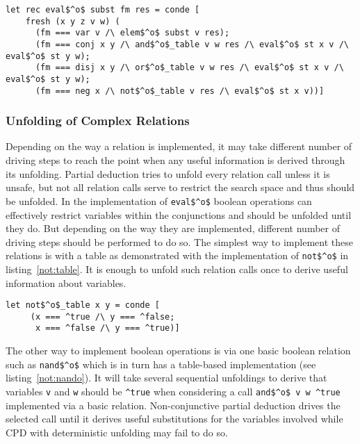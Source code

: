 \begin{lstlisting}[label={eval:fst}, caption={Evaluator of formulas with boolean operation second}, captionpos=b]
  let rec eval$^o$ subst fm res = conde [
    fresh (x y z v w) (
      (fm === var v /\ elem$^o$ subst v res);
      (fm === conj x y /\ and$^o$_table v w res /\ eval$^o$ st x v /\ eval$^o$ st y w);
      (fm === disj x y /\ or$^o$_table v w res /\ eval$^o$ st x v /\ eval$^o$ st y w);
      (fm === neg x /\ not$^o$_table v res /\ eval$^o$ st x v))]
  \end{lstlisting}

\subsubsection{Unfolding of Complex Relations}

Depending on the way a relation is implemented, it may take different number of driving steps to reach the point when any useful information is derived through its unfolding.
Partial deduction tries to unfold every relation call unless it is unsafe, but not all relation calls serve to restrict the search space and thus should be unfolded.
In the implementation of \lstinline{eval$^o$} boolean operations can effectively restrict variables within the conjunctions and should be unfolded until they do.
But depending on the way they are implemented, different number of driving steps should be performed to do so.
The simplest way to implement these relations is with a table as demonstrated with the implementation of \lstinline{not$^o$} in listing~\ref{not:table}.
It is enough to unfold such relation calls once to derive useful information about variables.

\begin{lstlisting}[label={not:table}, caption={Implementation of boolean \lstinline{not} as a table}, captionpos=b]
  let not$^o$_table x y = conde [
     (x === ^true /\ y === ^false;
      x === ^false /\ y === ^true)]
\end{lstlisting}

The other way to implement boolean operations is via one basic boolean relation such as \lstinline{nand$^o$} which is in turn has a table-based implementation (see listing~\ref{not:nando}).
It will take several sequential unfoldings to derive that variables \lstinline{v} and \lstinline{w} should be \lstinline{^true} when considering a call \lstinline{and$^o$ v w ^true} implemented via a basic relation.
Non-conjunctive partial deduction drives the selected call until it derives useful substitutions for the variables involved while CPD with deterministic unfolding may fail to do so.

